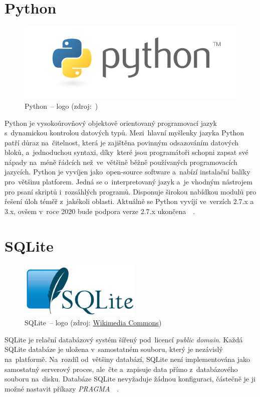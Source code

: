 \section{Python}
\label{python}

	\begin{figure}[H] \centering
		\includegraphics[width=.5\textwidth]{./pictures/python_logo.png}
      	\caption[Python~– logo]{Python~– logo (zdroj:~\citep{python})}
		\label{fig:python_logo}
 	\end{figure}

Python je vysokoúrovňový objektově orientovaný programovací jazyk
s~dynamickou kontrolou datových typů. Mezi~hlavní myšlenky jazyka
Python patří důraz na~čitelnost, která je zajištěna povinným
odsazováním datových bloků, a~jednoduchou syntaxi, díky~které jsou
programátoři schopni zapsat své nápady na~méně řádcích než~ve~většině
běžně používaných programovacích jazycích. Python je vyvíjen
jako~open-source software a~nabízí instalační balíky pro~většinu
platforem. Jedná se o~interpretovaný jazyk a~je vhodným nástrojem pro
psaní skriptů i~rozsáhlých programů. Disponuje širokou nabídkou modulů
pro řešení úloh téměř z~jakékoli oblasti. Aktuálně se Python vyvíjí
ve~verzích 2.7.x a 3.x, ovšem v~roce 2020 bude podpora verze 2.7.x
ukončena~\citep{python}~\citep{wiki_python}.

\section{SQLite}
\label{sqlite}

	\begin{figure}[H] \centering
		\includegraphics[width=.2\textwidth]{./pictures/sqlite_logo.png}
      	\caption[SQLite~– logo]{SQLite~– logo (zdroj:
\href{http://commons.wikimedia.org/wiki/File:SQLite_Logo_4.png}{Wikimedia
Commons})}
		\label{fig:sqlite_logo}
 	\end{figure}

SQLite je relační databázový systém šířený pod~licencí \textit{public
domain}. Každá SQLite databáze je uložena v~samostatném souboru, který
je nezávislý na~platformě. Na~rozdíl od~většiny databází, SQLite není
implementována jako samostatný serverový proces, ale~čte a~zapisuje
data přímo z~databázového souboru na~disku. Databáze SQLite nevyžaduje
žádnou konfiguraci, částečně je ji možné nastavit příkazy
\textit{PRAGMA}~\citep{sqlite}~\citep{wiki_sqlite}.

